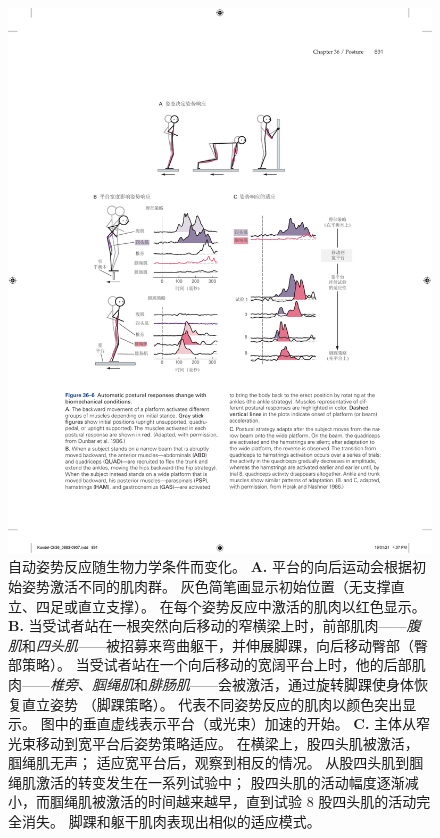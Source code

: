 \begin{figure}[htbp]
	\centering
	\includegraphics[width=0.95\linewidth]{chap36/fig_36_6}
	\caption{自动姿势反应随生物力学条件而变化。
		\textbf{A.} 平台的向后运动会根据初始姿势激活不同的肌肉群。
		灰色简笔画显示初始位置（无支撑直立、四足或直立支撑）。
		在每个姿势反应中激活的肌肉以红色显示\cite{dunbar1986neural}。
		\textbf{B.} 当受试者站在一根突然向后移动的窄横梁上时，前部肌肉——\textit{腹肌}和\textit{四头肌}——被招募来弯曲躯干，并伸展脚踝，向后移动臀部（臀部策略）。
		当受试者站在一个向后移动的宽阔平台上时，他的后部肌肉——\textit{椎旁}、\textit{腘绳肌}和\textit{腓肠肌}——会被激活，通过旋转脚踝使身体恢复直立姿势 （脚踝策略）。
		代表不同姿势反应的肌肉以颜色突出显示。 图中的垂直虚线表示平台（或光束）加速的开始。
		\textbf{C.} 主体从窄光束移动到宽平台后姿势策略适应。
		在横梁上，股四头肌被激活，腘绳肌无声；
		适应宽平台后，观察到相反的情况。
		从股四头肌到腘绳肌激活的转变发生在一系列试验中；
		股四头肌的活动幅度逐渐减小，而腘绳肌被激活的时间越来越早，直到试验 8 股四头肌的活动完全消失。
		脚踝和躯干肌肉表现出相似的适应模式\cite{horak1986central}。}
	\label{fig:36_6}
\end{figure}


